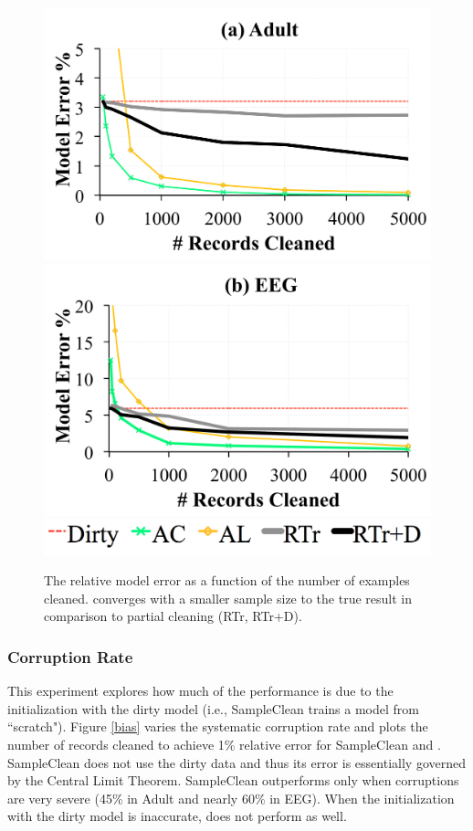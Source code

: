 
\begin{figure}[ht!]
\centering\vspace{-0.5em}
 \includegraphics[width=0.49\columnwidth]{exp/exp14a.pdf}
    \includegraphics[width=0.49\columnwidth]{exp/exp14b.pdf}
    \includegraphics[width=0.49\columnwidth]{exp/legend-14.png}\vspace{-0.5em}
 \caption{The relative model error as a function of the number of examples cleaned. \sys converges with a smaller sample size to the true result in comparison to partial cleaning (RTr, RTr+D).  \label{pc-perf}}
\end{figure}

\subsubsection{Corruption Rate}
This experiment explores how much of the performance
is due to the initialization with the dirty model (i.e., SampleClean trains a model from ``scratch").
Figure \ref{bias} varies the systematic corruption rate and plots the number of records cleaned to achieve 1\% relative error for SampleClean and \sys.
SampleClean does not use the dirty data and thus its error is essentially governed by the Central Limit Theorem.
SampleClean outperforms \sys only when corruptions are very severe (45\% in Adult and nearly 60\% in EEG).
When the initialization with the dirty model is inaccurate, \sys does not perform as well. 


